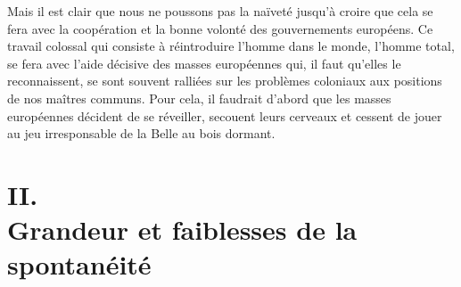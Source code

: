 \documentclass[french,twoside]{book} %
\newcommand\chapteropen{} %
\newcommand\chapterclose{} %
\begin{document}
Mais il est clair que nous ne poussons pas la naïveté jusqu’à croire que cela se fera avec la coopération et la bonne volonté des gouvernements européens. Ce travail colossal qui consiste à réintroduire l’homme dans le monde, l’homme total, se fera avec l’aide décisive des masses européennes qui, il faut qu’elles le reconnaissent, se sont souvent ralliées sur les problèmes coloniaux aux positions de nos maîtres communs. Pour cela, il faudrait d’abord que les masses européennes décident de se réveiller, secouent leurs cerveaux et cessent de jouer au jeu irresponsable de la Belle au bois dormant.\par
 \chapterclose


\chapteropen
\chapter[{II. Grandeur et faiblesses de la spontanéité}]{II. \\
Grandeur et faiblesses de la spontanéité}\renewcommand{\leftmark}{II. \\
Grandeur et faiblesses de la spontanéité}
\end{document}
